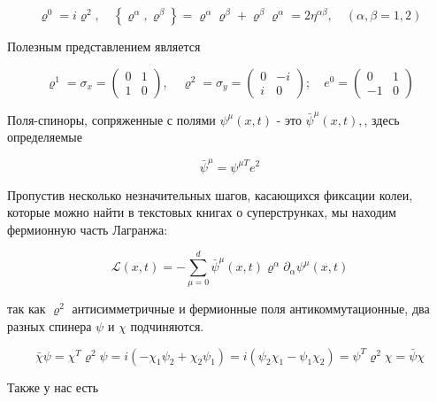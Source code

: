 \documentclass[main.tex]{subfiles}
\begin{document}
\begin{equation}\label{17.121}
\varrho^{0}=i \varrho^{2}, \quad\left\{\varrho^{\alpha}, \varrho^{\beta}\right\}=\varrho^{\alpha} \varrho^{\beta}+\varrho^{\beta} \varrho^{\alpha}=2 \eta^{\alpha \beta}, \quad(\alpha, \beta=1,2)
\end{equation}

Полезным представлением является

\begin{equation}\label{17.121}
\varrho^{1}=\sigma_{x}=\left(\begin{array}{cc}{0} & {1} \\ {1} & {0}\end{array}\right), \quad \varrho^{2}=\sigma_{y}=\left(\begin{array}{cc}{0} & {-i} \\ {i} & {0}\end{array}\right) ; \quad e^{0}=\left(\begin{array}{cc}{0} & {1} \\ {-1} & {0}\end{array}\right)
\end{equation}

Поля-спиноры, сопряженные с полями $\psi^{\mu}(x, t)$ - это $\bar{\psi}^{\mu}(x, t),$, здесь определяемые

\begin{equation}\label{17.123}
\bar{\psi}^{\mu}=\psi^{\mu T} e^{2}
\end{equation}

Пропустив несколько незначительных шагов, касающихся фиксации колеи, которые можно найти в текстовых книгах о суперструнках, мы находим фермионную часть Лагранжа:

\begin{equation}\label{17.124}
\mathcal{L}(x, t)=-\sum_{\mu=0}^{d} \bar{\psi}^{\mu}(x, t) \varrho^{\alpha} \partial_{\alpha} \psi^{\mu}(x, t)
\end{equation}

так как $\varrho^{2}$ антисимметричные и фермионные поля антикоммутационные, два разных спинера $\psi$ и $\chi$ подчиняются.

\begin{equation}\label{17.125}
\bar{\chi} \psi=\chi^{T} \varrho^{2} \psi=i\left(-\chi_{1} \psi_{2}+\chi_{2} \psi_{1}\right)=i\left(\psi_{2} \chi_{1}-\psi_{1} \chi_{2}\right)=\psi^{T} \varrho^{2} \chi=\bar{\psi} \chi
\end{equation}

Также у нас есть
\end{document}
